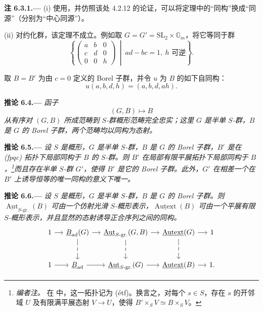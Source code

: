 \par\medskip\noindent{}\textbf{注 6.3.1.---}\enspace
(i) 使用，并仿照该处 4.2.12 的论证，可以将定理中的“同构”换成“同源”（分别为“中心同源”）。

(ii) 对约化群，该定理不成立。例如取 \(G=G'=\mathrm{SL}_2\times\mathbb G_m\)，将它等同于群
\[
 \left\{
 \begin{pmatrix}
   a&b&0\\
   c&d&0\\
   0&0&h
 \end{pmatrix}
 \ \middle|\ ad-bc=1,\ h\text{ 可逆}
 \right\}.
\]

\setcounter{footnote}{29}
取 \(B=B'\) 为由 \(c=0\) 定义的 Borel 子群，并令 \(u\) 为 \(B\) 的如下自同构：
\[
  u(a,b,d,h)=(a,b,d,ah).
\]

\par\medskip\noindent{}\textbf{推论 6.4.---}\enspace
\emph{函子
\[
  (G,B)\longmapsto B
\]
从有序对 \((G,B)\) 所成范畴到 \(S\)-群概形范畴完全忠实；这里 \(G\) 是半单 \(S\)-群，\(B\) 是 \(G\) 的 Borel 子群，两个范畴均以同构为态射。}

\par\medskip\noindent{}\textbf{推论 6.5.---}\enspace
\emph{设 \(S\) 是概形，\(G\) 是半单 \(S\)-群，\(B\) 是 \(G\) 的 Borel 子群，\(B'\) 是在 \textup{(fpqc)} 拓扑下局部同构于 \(B\) 的 \(S\)-群。则 \(B'\) 在局部有限平展拓扑下局部同构于 \(B\)，\footnote{\textit{编者注。} 在 中，这一拓扑记为 \textup{(étf)}。换言之，对每个 \(s\in S\)，存在 \(s\) 的开邻域 \(U\) 及有限满平展态射 \(V\to U\)，使得 \(B'\times_S V\simeq B\times_S V\)。}而且存在半单 \(S\)-群 \(G'\)，使得 \(B'\) 是它的 Borel 子群。此外，\(G'\) 在相差一个在 \(B'\) 上诱导恒等的唯一同构的意义下唯一。}

\par\medskip\noindent{}\textbf{推论 6.6.---}\enspace
\emph{设 \(S\) 是概形，\(G\) 是半单 \(S\)-群，\(B\) 是 \(G\) 的 Borel 子群。则 \(\underline{\operatorname{Aut}}_{S\text{-}\mathrm{gr.}}(B)\) 可由一个仿射光滑 \(S\)-概形表示，\(\underline{\operatorname{Autext}}(B)\) 可由一个平展有限 \(S\)-概形表示，并且显然的态射诱导正合序列之间的同构。}
\[
\begin{tikzcd}[column sep=small,row sep=large]
1 \arrow[r]
&
\underline{B}_{\mathrm{ad}}(G)
  \arrow[r]
  \arrow[d,"\wr" description]
&
\underline{\Aut}_{S\text{-}\mathrm{gr.}}(G,B)
  \arrow[r]
  \arrow[d,"\wr" description]
&
\underline{\Autext}(G)
  \arrow[r]
  \arrow[d,"\wr" description]
&
1
\\
1 \arrow[r]
&
\underline{B}_{\mathrm{ad}}
  \arrow[r]
&
\underline{\Aut}_{S\text{-}\mathrm{gr.}}(G)
  \arrow[r]
&
\underline{\Autext}(B)
  \arrow[r]
&
1 .
\end{tikzcd}
\]


